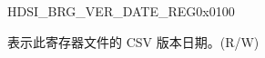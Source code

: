 \begin{register}{H}{DSI\_BRG\_VER\_DATE\_REG}{0x0100}\label{regdesc:DSIBRGVERDATEREG}
%
\regnewline%
\begin{regdesc}\begin{reglist}
\label{fielddesc:DSIBRGVERDATA}\item [DSI\_BRG\_VER\_DATA] 表示此寄存器文件的 CSV 版本日期。(R/W)
\end{reglist}\end{regdesc}
\end{register}
